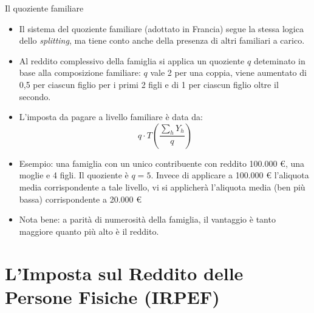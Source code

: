 \documentclass[aspectratio=64,12pt]{beamer}
\newcommand\€{\,\text{€}}
\begin{document}
\begin{frame}{Il quoziente familiare}
\begin{itemize}
\item Il sistema del \alert{quoziente familiare} (adottato in Francia) segue la stessa
logica dello \emph{splitting}, ma tiene conto anche della presenza di altri
familiari a carico.
\item Al reddito complessivo della famiglia si applica un quoziente $q$ deteminato
in base alla composizione familiare: $q$ vale 2 per una coppia, viene aumentato di 0,5 per ciascun figlio per i primi 2 figli e di 1 per ciascun figlio oltre il secondo.
\item L'imposta da pagare a livello familiare è data da:
\begin{equation*}
  q\cdot T\left( \frac{\sum_{h}Y_{h}}{q} \right)
\end{equation*}
\item Esempio: una famiglia con un unico contribuente con reddito 100.000 €, una
moglie e 4 figli. Il quoziente è $q=5$. Invece di applicare a 100.000 €
l'aliquota media corrispondente a tale livello, vi si applicherà l'aliquota
media (ben più bassa) corrispondente a 20.000 €
\item Nota bene: a parità di numerosità della famiglia, il vantaggio è tanto
maggiore quanto più alto è il reddito.
\end{itemize}
\end{frame}

\section{L'Imposta sul Reddito delle Persone Fisiche (IRPEF)}
\end{document}
